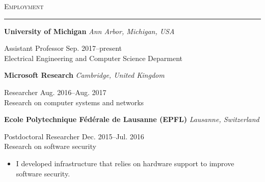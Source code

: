 \documentclass[10pt]{article}
\newcommand{\mysec}[1]{\vspace{2em}\textsc{\large #1}\vspace{1mm}\hrule\vspace{2mm}}
\newcommand{\mysub}[3]{\textbf{#1} {#2} \hfill {\em #3}}
\newcommand{\myssub}[1]{\hspace*{2mm}\parbox{163mm}{#1}\vspace*{2mm}}
\begin{document}

\mysec{Employment}

\mysub{University of Michigan}{}{Ann Arbor, Michigan, USA} \\
\myssub{Assistant Professor\vspace{1mm} \hfill Sep. 2017--present \\
Electrical Engineering and Computer Science Deparment}

\mysub{Microsoft Research}{}{Cambridge, United Kingdom} \\
\myssub{\vspace{1mm}Researcher \hfill Aug. 2016--Aug. 2017 \\
Research on computer systems and networks}

\mysub{Ecole Polytechnique F\'ed\'erale de Lausanne (EPFL)}{}{Lausanne, Switzerland} \\
\myssub{\vspace{1mm}Postdoctoral Researcher \hfill Dec. 2015--Jul. 2016 \\
Research on software security
\begin{itemize}
\item{I developed infrastructure that relies on hardware support to improve software security.}
\end{itemize}
}
\end{document}
